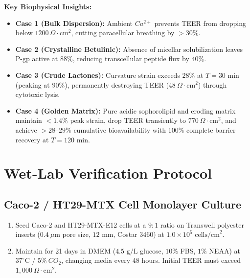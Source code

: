 \documentclass[10pt,twocolumn,letterpaper]{article}
\begin{document}
\noindent
\textbf{Key Biophysical Insights:}
\begin{itemize}[noitemsep]
    \item \textbf{Case 1 (Bulk Dispersion):} Ambient $Ca^{2+}$ prevents TEER from dropping below $1200\ \Omega\cdot\text{cm}^2$, cutting paracellular breathing by $>30\%$.
    \item \textbf{Case 2 (Crystalline Betulinic):} Absence of micellar solubilization leaves P-gp active at $88\%$, reducing transcellular peptide flux by $40\%$.
    \item \textbf{Case 3 (Crude Lactones):} Curvature strain exceeds $28\%$ at $T=30\text{ min}$ (peaking at $90\%$), permanently destroying TEER ($48\ \Omega\cdot\text{cm}^2$) through cytotoxic lysis.
    \item \textbf{Case 4 (Golden Matrix):} Pure acidic sophorolipid and eroding matrix maintain $<1.4\%$ peak strain, drop TEER transiently to $770\ \Omega\cdot\text{cm}^2$, and achieve $>28\text{--}29\%$ cumulative bioavailability with 100\% complete barrier recovery at $T=120\text{ min}$.
\end{itemize}

\section{Wet-Lab Verification Protocol}

\subsection{Caco-2 / HT29-MTX Cell Monolayer Culture}
\begin{enumerate}[noitemsep]
    \item Seed Caco-2 and HT29-MTX-E12 cells at a $9:1$ ratio on Transwell polyester inserts ($0.4\ \mu\text{m}$ pore size, $12\text{ mm}$, Costar 3460) at $1.0\times 10^5\text{ cells/cm}^2$.
    \item Maintain for 21 days in DMEM ($4.5\text{ g/L}$ glucose, $10\%$ FBS, $1\%$ NEAA) at $37^\circ\text{C}$ / $5\%\ CO_2$, changing media every 48 hours. Initial TEER must exceed $1,000\ \Omega\cdot\text{cm}^2$.
\end{enumerate}
\end{document}

